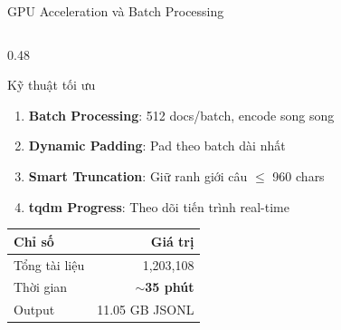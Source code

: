 \begin{frame}{GPU Acceleration và Batch Processing}
\begin{columns}[T]
\begin{column}{0.48\textwidth}
\begin{block}{Kỹ thuật tối ưu}
{\footnotesize
\begin{enumerate}\itemsep0pt \parskip0pt 
    \item \textbf{Batch Processing}: 512 docs/batch, encode song song
    \item \textbf{Dynamic Padding}: Pad theo batch dài nhất
    \item \textbf{Smart Truncation}: Giữ ranh giới câu $\leq$ 960 chars
    \item \textbf{tqdm Progress}: Theo dõi tiến trình real-time
\end{enumerate}
}
\end{block}

\vspace{0.05cm}

\centering
\renewcommand{\arraystretch}{0.95}
{\footnotesize
\begin{tabular}{l r}
\toprule
\textbf{Chỉ số} & \textbf{Giá trị} \\
\midrule
Tổng tài liệu & 1,203,108 \\
Thời gian & \textcolor{accentTeal}{\textbf{$\sim$35 phút}} \\
Output & 11.05 GB JSONL \\
\bottomrule
\end{tabular}
}

\end{column}
\end{columns}
\end{frame}

